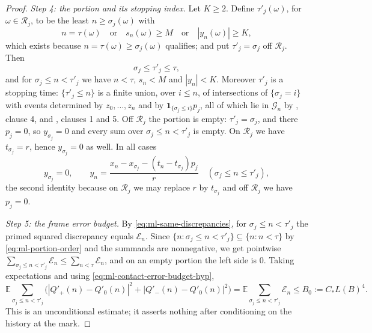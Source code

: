 \begin{proof}
\emph{Step 4: the portion and its stopping index.}
Let $K\ge2$. Define $\tau'_j(\omega)$, for $\omega\in\mathcal R_j$, to be the
least $n\ge\sigma_j(\omega)$ with
\[
  n=\tau(\omega)\quad\text{or}\quad s_n(\omega)\ge M
  \quad\text{or}\quad |y_n(\omega)|\ge K,
\]
which exists because $n=\tau(\omega)\ge\sigma_j(\omega)$ qualifies; and put
$\tau'_j=\sigma_j$ off $\mathcal R_j$. Then
\begin{equation}\label{eq:ml-portion-order}
  \sigma_j\le\tau'_j\le\tau ,
\end{equation}
and for $\sigma_j\le n<\tau'_j$ we have $n<\tau$, $s_n<M$ and $|y_n|<K$.
Moreover $\tau'_j$ is a stopping time: $\{\tau'_j\le n\}$ is a finite union, over
$i\le n$, of intersections of $\{\sigma_j=i\}$ with events determined by
$z_0,\dots,z_n$ and by $\mathbf1_{\{\sigma_j\le i\}}p_j$, all of which lie in
$\mathcal G_n$ by , clause 4, and
, clauses 1 and 5. Off $\mathcal R_j$ the portion is empty:
$\tau'_j=\sigma_j$, and there $p_j=0$, so $y_{\sigma_j}=0$ and every sum over
$\sigma_j\le n<\tau'_j$ is empty. On $\mathcal R_j$ we have $t_{\sigma_j}=r$,
hence $y_{\sigma_j}=0$ as well. In all cases
\begin{equation}\label{eq:ml-y-start}
  y_{\sigma_j}=0,\qquad
  y_n=\frac{x_n-x_{\sigma_j}-(t_n-t_{\sigma_j})p_j}{r}
  \quad(\sigma_j\le n\le\tau'_j),
\end{equation}
the second identity because on $\mathcal R_j$ we may replace $r$ by
$t_{\sigma_j}$ and off $\mathcal R_j$ we have $p_j=0$.

\emph{Step 5: the frame error budget.}
By \eqref{eq:ml-same-discrepancies}, for $\sigma_j\le n<\tau'_j$ the primed
squared discrepancy equals $\mathcal E_n$. Since
$\{n:\sigma_j\le n<\tau'_j\}\subseteq\{n:n<\tau\}$ by
\eqref{eq:ml-portion-order} and the summands are nonnegative, we get pointwise
$\sum_{\sigma_j\le n<\tau'_j}\mathcal E_n\le\sum_{n<\tau}\mathcal E_n$, and on
an empty portion the left side is $0$. Taking expectations and using
\eqref{eq:ml-contact-error-budget-hyp},
\begin{equation}\label{eq:contact-frame-error-budget}
  \mathbb E\sum_{\sigma_j\le n<\tau'_j}
    \bigl(|Q'_+(n)-Q'_0(n)|^2+|Q'_-(n)-Q'_0(n)|^2\bigr)
   =\mathbb E\sum_{\sigma_j\le n<\tau'_j}\mathcal E_n
   \le B_0:=C_*L(B)^4 .
\end{equation}
This is an unconditional estimate; it asserts nothing after conditioning on the
history at the mark.


\end{proof}
